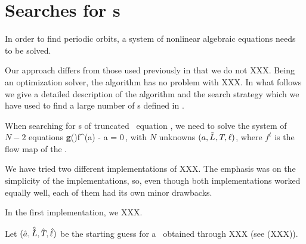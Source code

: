 
\section{Searches for \po s}
\label{sec:lmderRLD}

In order to find periodic orbits, a system of nonlinear
algebraic equations needs to be solved.

Our approach differs from those used previously in that we do
not XXX.  Being an optimization solver,
the algorithm has no problem with XXX. In what
follows we give a detailed description of the algorithm and
the search strategy which we have used to find a large number
of \po s defined in .

When searching for \rpo s of truncated \KS\ equation
, we need to solve the system of $N-2$ equations
\beq
  {\bf g}(\shift)f^\period{}(a) - a = 0\,,
with $N$ unknowns $(a, {\tilde{L}_{}}, T_{}, \ell)$, where $f^t$
is the flow map of the \KSe.

We have tried two different implementations of XXX.
The emphasis was on the simplicity of the implementations, so, even
though both implementations worked equally well, each of them had
its own minor drawbacks.

In the first implementation, we XXX.

Let $(\hat{a}, \hat{{\tilde{L}_{}}}, \hat{T_{}}, \hat{\ell})$ be the starting guess for a \rpo\
obtained through XXX (see (XXX)).

